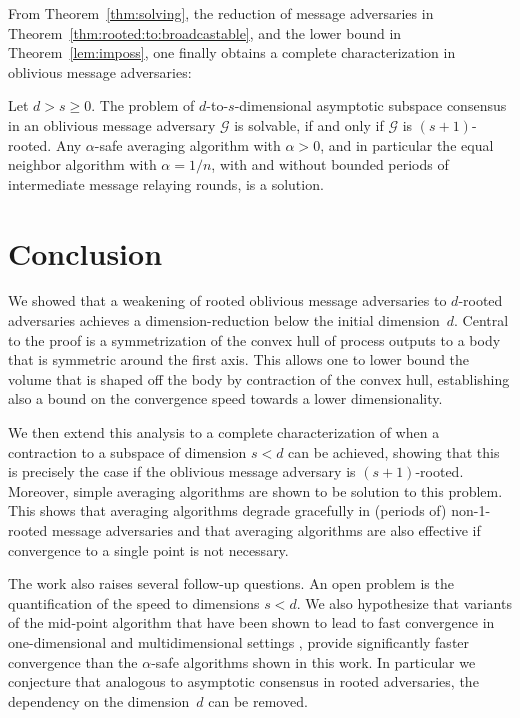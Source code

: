 \documentclass[a4paper,USenglish]{lipics-v2021}
\newcommand{\N}{\mathcal{G}}
\renewcommand{\geq}{\geqslant}
\begin{document}
From Theorem~\ref{thm:solving}, the reduction of message adversaries in Theorem~\ref{thm:rooted:to:broadcastable}, and the lower bound in Theorem~\ref{lem:imposs}, one finally obtains a complete characterization in oblivious message adversaries:

\begin{corollary}
	Let $d > s \geq 0$.
	The problem of $d$-to-$s$-dimensional asymptotic subspace consensus in an oblivious message adversary $\N$ is solvable, if and only if  $\N$ is $(s+1)$-rooted.
	Any $\alpha$-safe averaging algorithm with $\alpha > 0$, and in particular the equal neighbor algorithm with $\alpha = 1/n$, with and without bounded periods of intermediate message relaying rounds, is a solution.
\end{corollary}


\section{Conclusion}\label{sec:conclusion}

We showed that a weakening of rooted oblivious message adversaries to
$d$-rooted adversaries achieves a dimension-reduction below the initial dimension~$d$.
Central to the proof is a symmetrization of the convex hull of process outputs to a body that is symmetric around the first axis.
This allows one to lower bound the volume that is shaped off the body by contraction of the convex hull, establishing also a bound
on the convergence speed towards a lower dimensionality.

We then extend this analysis to a complete characterization of when a contraction to a subspace of dimension $s < d$ can be achieved, showing that this is precisely the case if the oblivious message adversary is $(s+1)$-rooted.
Moreover, simple averaging algorithms are shown to be solution to this problem.
This shows that averaging algorithms degrade gracefully in (periods of) non-1-rooted message adversaries and that averaging algorithms are
also effective if convergence to a single point is not necessary.

The work also raises several follow-up questions.
An open problem is the quantification of the speed to dimensions $s < d$.
We also hypothesize that variants of the mid-point algorithm that have been shown to lead to fast convergence in one-dimensional \cite{CBFN16:icalp} and multidimensional settings \cite{CBFN16:centroid,FN18:disc}, provide significantly faster convergence than the $\alpha$-safe algorithms shown in this work.
In particular we conjecture that analogous to asymptotic consensus in rooted adversaries, the dependency on the dimension~$d$ can be removed.




\end{document}
